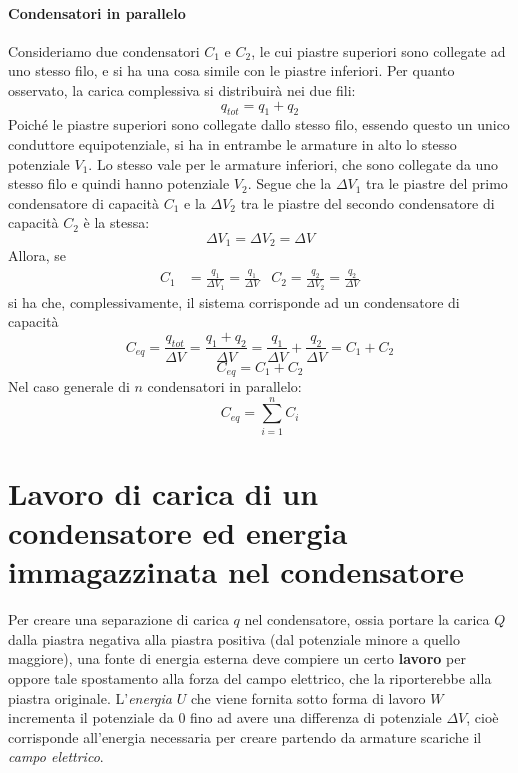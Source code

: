 \paragraph{Condensatori in parallelo}
Consideriamo due condensatori $C_1$ e $C_2$, le cui piastre superiori sono collegate ad uno stesso filo, e si ha una cosa simile con le piastre inferiori.
Per quanto osservato, la carica complessiva si distribuirà nei due fili:
\begin{equation*}
	q_{tot}=q_1+q_2
\end{equation*}
Poiché le piastre superiori sono collegate dallo stesso filo, essendo questo un unico conduttore equipotenziale, si ha in entrambe le armature in alto lo stesso potenziale $V_1$. Lo stesso vale per le armature inferiori, che sono collegate da uno stesso filo e quindi hanno potenziale $V_2$. Segue che la \ddp $\Delta V_1$ tra le piastre del primo condensatore di capacità $C_1$ e la \ddp $\Delta V_2$ tra le piastre del secondo condensatore di capacità $C_2$ è la stessa:
\begin{equation*}
	\Delta V_1=\Delta V_2=\Delta V
\end{equation*}
Allora, se
\begin{align*}
	C_1&=\frac{q_1}{\Delta V_1}=\frac{q_1}{\Delta V} & C_2=\frac{q_2}{\Delta V_2}=\frac{q_2}{\Delta V}
\end{align*}
si ha che, complessivamente, il sistema corrisponde ad un condensatore di capacità
\begin{equation*}
	C_{eq}=\frac{q_{tot}}{\Delta V}=\frac{q_1+q_2}{\Delta V}=\frac{q_1}{\Delta V}+\frac{q_2}{\Delta V}=C_1+C_2
\end{equation*}
\begin{equation}
	C_{eq}=C_1+C_2
\end{equation}
Nel caso generale di $n$ condensatori in parallelo:
\begin{equation}
	C_{eq}=\sum_{i=1}^{n}C_i
\end{equation}
\section{Lavoro di carica di un condensatore ed energia immagazzinata nel condensatore} %
Per creare una separazione di carica $q$ nel condensatore, ossia portare la carica $Q$ dalla piastra negativa alla piastra positiva (dal potenziale minore a quello maggiore), una fonte di energia esterna deve compiere un certo \textbf{lavoro} per oppore tale spostamento alla forza del campo elettrico, che la riporterebbe alla piastra originale. L'\textit{energia} $U$ che viene fornita sotto forma di lavoro $W$ incrementa il potenziale da $0$ fino ad avere una differenza di potenziale $\Delta V$, cioè corrisponde all'energia necessaria per creare partendo da armature scariche il \textit{campo elettrico}.

